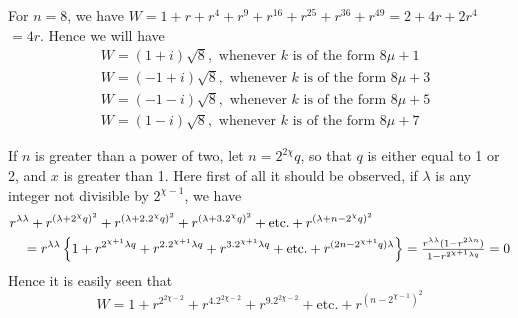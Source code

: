 \documentclass[twoside,12pt, showframe]{memoir}
\let\oldfrac\frac
\def\frac#1#2{\mathchoice{\tfrac{#1}{#2}}{\oldfrac{#1}{#2}}{\genfrac{}{}{}{2}{#1}{#2\mathstrut}}{\genfrac{}{}{}{3}{#1}{#2\mathstrut}}}
\begin{document}
For \(n=8\), we have \(W=1+r+r^{4}+r^{9}+r^{16}+r^{25}+r^{36}+r^{49}=2+4 r+2 r^{4}\) \(=4 r\). Hence we will have
\[\begin{aligned}
& W=(1+i) \sqrt{8}, \text{ whenever } k \text{ is of the form } 8 \mu+1 \\
& W=(-1+i) \sqrt{8}, \text{ whenever } k \text{ is of the form } 8 \mu+3 \\
& W=(-1-i) \sqrt{8}, \text{ whenever } k \text{ is of the form } 8 \mu+5 \\
& W=(1-i) \sqrt{8}, \text{ whenever } k \text{ is of the form } 8 \mu+7
\end{aligned}\]
%

If \(n\) is greater than a power of two, let \(n=2^{2 \chi} q\), so that \(q\) is either equal to 1 or 2, and \(x\) is greater than 1. Here first of all it should be observed, if \(\lambda\) is any integer not divisible by \(2^{\chi-1}\), we have
\[\begin{aligned}
& r^{\lambda \lambda}+r^{(\lambda+2^{\chi} q)^{2}}+r^{(\lambda+2.2^{\chi} q)^{2}}+r^{(\lambda+3.2^{\chi} q)^{2}}+\text{etc.}+r^{(\lambda+n-2^{\chi} q)^{2}} \\
& \quad=r^{\lambda \lambda}\left\{1+r^{2^{\chi+1} \lambda q}+r^{2.2^{\chi+1} \lambda q}+r^{3.2^{\chi+1} \lambda q}+\text{etc.}+r^{(2 n-2^{\chi+1} q) \lambda}\right\}=\frac{r^{\lambda \lambda}(1-r^{2 \lambda n})}{1-r^{2^{\chi+1} \lambda q}}=0
\end{aligned}\]
Hence it is easily seen that
\[W=1+r^{2^{2 \chi-2}}+r^{4.2^{2 \chi-2}}+r^{9.2^{2 \chi-2}}+\text{etc.}+r^{(n-2^{\chi-1})^{2}}\]
%
\end{document}
